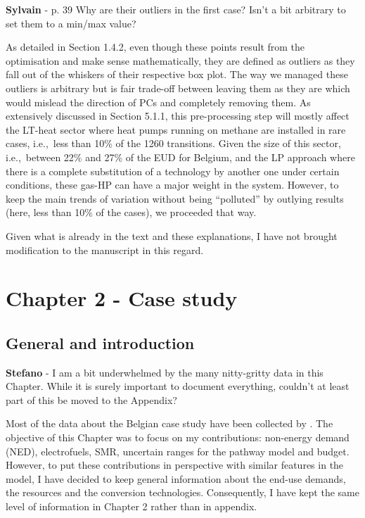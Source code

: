 \documentclass[12pt,a4paper]{article}
\def\ie{i.e.,\ }
\begin{document}
\begin{mdframed}[style=comment] %
{\color{purple} \textbf{Sylvain}} - p. 39 Why are their outliers in the first case? Isn't a bit arbitrary to set them to a min/max value?
\end{mdframed}

\noindent As detailed in Section 1.4.2, even though these points result from the optimisation and make sense mathematically, they are defined as outliers as they fall out of the whiskers of their respective box plot. The way we managed these outliers is arbitrary but is fair trade-off between leaving them as they are which would mislead the direction of PCs and completely removing them. As extensively discussed in Section 5.1.1, this pre-processing step will mostly affect the LT-heat sector where heat pumps running on methane are installed in rare cases, \ie less than 10\% of the 1260 transitions. Given the size of this sector, \ie between 22\% and 27\% of the EUD for Belgium, and the LP approach where there is a complete substitution of a technology by another one under certain conditions, these gas-HP can have a major weight in the system. However, to keep the main trends of variation without being ``polluted'' by outlying results (here, less than 10\% of the cases), we proceeded that way.

Given what is already in the text and these explanations, I have not brought modification to the manuscript in this regard.

\section{Chapter 2 - Case study}
\label{case_study}

\subsection{General and introduction}
\label{methodo_general}

\begin{mdframed}[style=comment] %
{\color{orange} \textbf{Stefano}} - I am a bit underwhelmed by the many nitty-gritty data in this Chapter. While it is surely important to document everything, couldn’t at least part of this be moved to the Appendix?
\end{mdframed}

\noindent Most of the data about the Belgian case study have been collected by \citet{limpens2021generating}. The objective of this Chapter was to focus on my contributions: non-energy demand (NED), electrofuels, SMR, uncertain ranges for the pathway model and  budget. However, to put these contributions in perspective with similar features in the model, I have decided to keep general information about the end-use demands, the resources and the conversion technologies. Consequently, I have kept the same level of information in Chapter 2 rather than in appendix.
\end{document}

